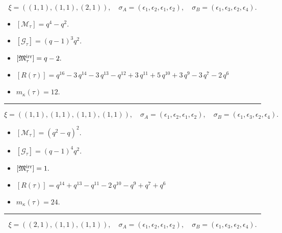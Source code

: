 \documentclass[10pt,a4paper]{amsart}
\begin{document}
$$\xi = ({(1, 1), (1, 1)}, {(2, 1)}),\quad \sigma_A = ({{\epsilon_1}, {\epsilon_2}}, {{\epsilon_1, \epsilon_2}}),\quad \sigma_B = ({{\epsilon_1}, {\epsilon_3}}, {{\epsilon_2, \epsilon_4}}).$$

\begin{itemize}
 \item $[\mathcal{M}_{\tau}] = q^{4} - q^{2} .$

 \item $[\mathcal{G}_{\tau}] = {\left(q - 1\right)}^{3} q^{2} .$

 \item $[{\frak M}_{\tau}^{\textrm{irr}}] = q - 2 .$

 \item $[R(\tau)] = q^{16} - 3 \, q^{14} - 3 \, q^{13} - q^{12} + 3 \, q^{11} + 5 \, q^{10} + 3 \, q^{9} - 3 \, q^{7} - 2 \, q^{6} $

 \item $m_{\kappa}(\tau) = 12 .$

 \end{itemize}
\noindent\rule{8cm}{0.4pt}

$$\xi = ({(1, 1), (1, 1)}, {(1, 1), (1, 1)}),\quad \sigma_A = ({{\epsilon_1}, {\epsilon_2}}, {{\epsilon_1}, {\epsilon_2}}),\quad \sigma_B = ({{\epsilon_1}, {\epsilon_3}}, {{\epsilon_2}, {\epsilon_4}}).$$

\begin{itemize}
 \item $[\mathcal{M}_{\tau}] = {\left(q^{2} - q\right)}^{2} .$

 \item $[\mathcal{G}_{\tau}] = {\left(q - 1\right)}^{4} q^{2} .$

 \item $[{\frak M}_{\tau}^{\textrm{irr}}] = 1 .$

 \item $[R(\tau)] = q^{14} + q^{13} - q^{11} - 2 \, q^{10} - q^{9} + q^{7} + q^{6} $

 \item $m_{\kappa}(\tau) = 24 .$

 \end{itemize}
\noindent\rule{8cm}{0.4pt}

$$\xi = ({(2, 1)}, {(1, 1)}, {(1, 1)}),\quad \sigma_A = ({{\epsilon_1, \epsilon_2}}, {{\epsilon_1}}, {{\epsilon_2}}),\quad \sigma_B = ({{\epsilon_1, \epsilon_3}}, {{\epsilon_2}}, {{\epsilon_4}}).$$
\end{document}
